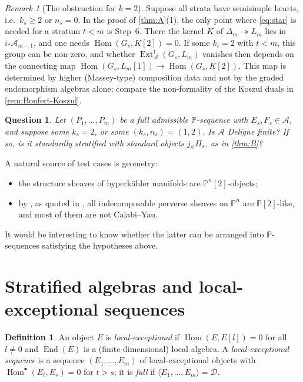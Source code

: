 \documentclass[11pt,reqno]{amsart}
\theoremstyle{plain}
\newtheorem{question}[theorem]{Question}
\theoremstyle{definition}
\newtheorem{definition}[theorem]{Definition}
\theoremstyle{remark}
\newtheorem{remark}[theorem]{Remark}
\DeclareMathOperator{\Hom}{Hom}
\DeclareMathOperator{\End}{End}
\DeclareMathOperator{\Ext}{Ext}
\newcommand{\thick}[1]{\langle #1\rangle}
\newcommand{\Pn}[2]{\mathbb{P}^{#1}[#2]}
\newcommand{\cD}{\mathcal{D}}
\newcommand{\cA}{\mathcal{A}}
\begin{document}
\begin{remark}[The obstruction for $k=2$]\label{rem:obstruction}
Suppose all strata have semisimple hearts, i.e.\ $k_s\ge2$ or $n_s=0$. In the proof of \cref{thm:A}(1), the only point where \eqref{eq:star} is needed for a stratum $t<m$ is Step~6. There the kernel $K$ of $\Delta_m\twoheadrightarrow L_m$ lies in $i_*\cA_{m-1}$, and one needs $\Hom(G_s,K[2])=0$. If some $k_t=2$ with $t<m$, this group can be non-zero, and whether $\Ext^1_\cA(G_s,L_m)$ vanishes then depends on the connecting map $\Hom(G_s,L_m[1])\to\Hom(G_s,K[2])$. This map is determined by higher (Massey-type) composition data and not by the graded endomorphism algebras alone; compare the non-formality of the Koszul duals in \cref{rem:Bonfert-Koszul}.
\end{remark}

\begin{question}\label{q:k2}
Let $(P_1,\dots,P_m)$ be a full admissible $\mathbb{P}$-sequence with $E_s,F_s\in\cA$, and suppose some $k_s=2$, or some $(k_s,n_s)=(1,2)$. Is $\cA$ Deligne finite? If so, is it standardly stratified with standard objects $j_{s!}\Pi_s$, as in \cref{thm:B}?
\end{question}

A natural source of test cases is geometry:
\begin{itemize}
\item the structure sheaves of hyperk\"ahler manifolds are $\Pn n2$-objects;
\item by \cite[Thm.~B]{BC25}, as quoted in \cite{Bonf26}, all indecomposable perverse sheaves on $\mathbb{P}^n$ are $\mathbb{P}[2]$-like, and most of them are not Calabi--Yau.
\end{itemize}
It would be interesting to know whether the latter can be arranged into $\mathbb{P}$-sequences satisfying the hypotheses above.

\section{Stratified algebras and local-exceptional sequences}\label{sec:stratified}

\begin{definition}\label{def:local-exc}
An object $E$ is \emph{local-exceptional} if $\Hom(E,E[l])=0$ for all $l\ne0$ and $\End(E)$ is a (finite-dimensional) local algebra. A \emph{local-exceptional sequence} is a sequence $(E_1,\dots,E_m)$ of local-exceptional objects with $\Hom^\bullet(E_t,E_s)=0$ for $t>s$; it is \emph{full} if $\thick{E_1,\dots,E_m}=\cD$.
\end{definition}
\end{document}

